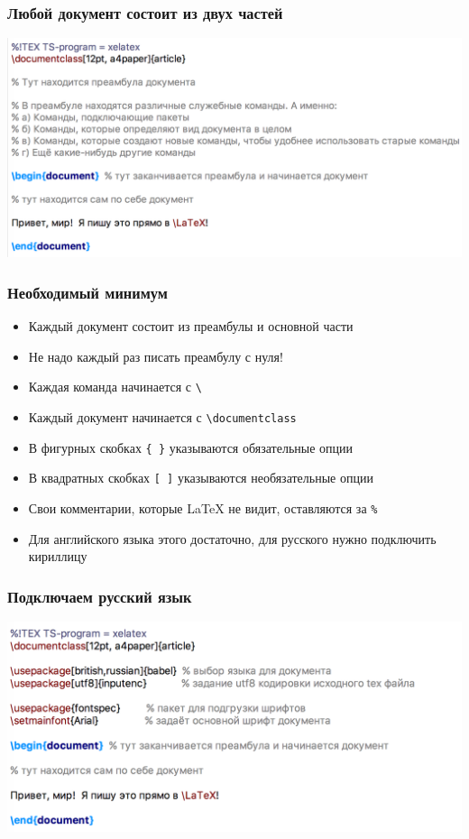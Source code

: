 \documentclass[aspectratio=169,newPxFont]{beamer}
\begin{document}
\begin{frame}[fragile]
\frametitle{Любой документ состоит из двух частей}
\begin{center}
\includegraphics[scale=0.28]{preamble.png} 
\end{center}
\end{frame}


\begin{frame}[fragile]
\frametitle{Необходимый минимум}
\begin{itemize}
	\item Каждый документ состоит из преамбулы и основной части
	\item \alert{Не надо каждый раз писать преамбулу с нуля!}
	\item Каждая команда начинается с \verb|\|
	\item Каждый документ начинается с \verb|\documentclass|
	\item В фигурных скобках \verb|{ }| указываются обязательные опции 
	\item В квадратных скобках \verb|[ ]| указываются необязательные опции
	\item Свои комментарии, которые \LaTeX{ } не видит, оставляются за \verb|%|
	\item Для английского языка этого достаточно, для русского нужно подключить кириллицу
\end{itemize}
\end{frame}


\begin{frame}[fragile]
\frametitle{Подключаем русский язык}
\begin{center}
	\includegraphics[scale=0.28]{preamble2.png} 
\end{center}
\end{frame}
\end{document}
